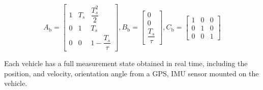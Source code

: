 \documentclass[letterpaper, 10pt, conference]{ieeeconf}  %
\def\eqref#1{(\ref{#1})}
\begin{document}
\begin{equation*}
        A_{\text{b}}  =\begin{bmatrix}
        1 & T_s & \dfrac{T^2_s}{2} \\
        0 & 1 & T_s \\
        0 &  0 & 1 - \dfrac{T_s}{\tau}
          \end{bmatrix},
        B_{\text{b}} =\begin{bmatrix}
        0 \\
        0 \\
        \dfrac{T_s}{\tau}
          \end{bmatrix}, 
  C_{\text{b}}=\begin{bmatrix}
        1 & 0 & 0 \\
        0 & 1 & 0 \\
        0 & 0 & 1
  \end{bmatrix}
\end{equation*}

Each vehicle has a full measurement state obtained in real time, including the  position, and velocity, orientation angle from a GPS, IMU sensor mounted on the vehicle. 

\end{document}
